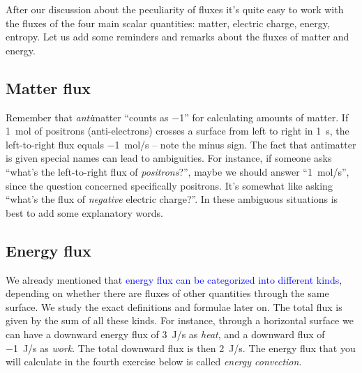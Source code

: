 \documentclass[a4paper,12pt,%
onecolumn,oneside,titlepage,%
british%
]{memoir}
\renewcommand*{\|}[1][]{\nonscript\:#1\vert\nonscript\:\mathopen{}}
\newcommand*{\sect}{\S}%
\renewcommand*{\autoref}[2]{\sidepar{\vspace{-1ex}\footnotesize{\color{blue}\faIcon{%
angle-right%
}\enspace\sect\,\ref{#1} page\,\pageref{#1}}}\textcolor{blue}{#2}}
\begin{document}
\bigskip

After our discussion about the peculiarity of fluxes it's quite easy to work with the fluxes of the four main scalar quantities: matter, electric charge, energy, entropy. Let us add some reminders and remarks about the fluxes of matter and energy.


\subsection{Matter flux}
\label{sec:matter_flux}

Remember that \emph{anti}matter \enquote{counts as \num{-1}} for calculating amounts of matter. If \qty{1}{mol} of positrons (anti-electrons) crosses a surface from left to right in \qty{1}{s}, the left-to-right flux equals \qty{-1}{mol/s} -- note the minus sign. The fact that antimatter is given special names can lead to ambiguities. For instance, if someone asks \enquote{what's the left-to-right flux of \emph{positrons}?}, maybe we should answer \enquote{\qty{1}{mol/s}}, since the question concerned specifically positrons. It's somewhat like asking \enquote{what's the flux of \emph{negative} electric charge?}. In these ambiguous situations is best to add some explanatory words.

\subsection{Energy flux}
\label{sec:energy_flux}
We already mentioned that \autoref{sec:forms_energy}{energy flux can be categorized into different kinds}, depending on whether there are fluxes of other quantities through the same surface. We study the exact definitions and formulae later on. The total flux is given by the sum of all these kinds. For instance, through a horizontal surface we can have a downward energy flux of \qty{3}{J/s} as \emph{heat}, and a downward flux of \qty{-1}{J/s} as \emph{work}. The total downward flux is then \qty{2}{J/s}. The energy flux that you will calculate in the fourth exercise below is called \emph{energy convection}.
\end{document}
